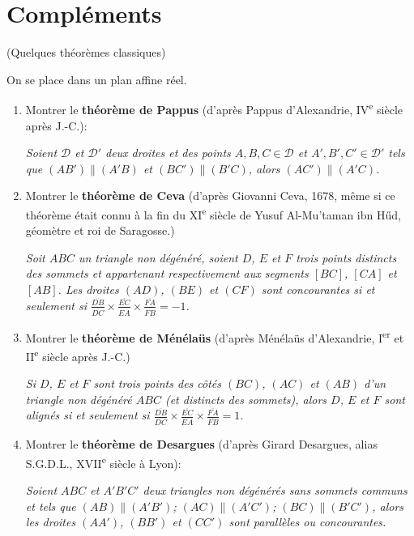 \documentclass[a4paper,12pt,reqno]{amsart}
\begin{document}
\section{Compléments}

\begin{exo} (Quelques théorèmes classiques)

  On se place dans un plan affine réel.

  \begin{enumerate}
  \item Montrer le \textbf{théorème de Pappus} (d'après Pappus d'Alexandrie, IV\textsuperscript{e} siècle après J.-C.):

  \textit{\og Soient $\mathcal{D}$ et $\mathcal{D}'$ deux droites et des points $A,B,C\in \mathcal{D}$ et $A',B',C'\in \mathcal{D}'$
  tels que $(AB')\parallel(A'B)$ et $(BC')\parallel(B'C)$, alors $(AC')\parallel(A'C)$.\fg}

  \item Montrer le \textbf{théorème de Ceva} (d'après Giovanni Ceva, 1678, même si ce théorème était connu à la fin du XI\textsuperscript{e} siècle de Yusuf Al-Mu'taman ibn Hűd, géomètre et roi de Saragosse.)

  \textit{\og Soit $ABC$ un triangle non dégénéré, soient $D$, $E$ et $F$ trois points distincts des sommets et appartenant respectivement aux segments $[BC]$, $[CA]$ et $[AB]$. Les droites $(AD)$, $(BE)$ et $(CF)$ sont concourantes si et seulement si $\frac{\overline{DB}}{\overline{DC}}\times\frac{\overline{EC}}{\overline{EA}}\times\frac{\overline{FA}}{\overline{FB}}=-1$.\fg}

  \item Montrer le \textbf{théorème de Ménélaüs} (d'après Ménélaüs d'Alexandrie, I\textsuperscript{er} et II\textsuperscript{e} siècle après J.-C.)

  \textit{\og Si $D$, $E$ et $F$ sont trois points des côtés $(BC)$, $(AC)$ et $(AB)$ d'un triangle non dégénéré $ABC$ (et distincts des sommets), alors $D$, $E$ et $F$ sont alignés si et seulement si $\frac{\overline{DB}}{\overline{DC}}\times\frac{\overline{EC}}{\overline{EA}}\times\frac{\overline{FA}}{\overline{FB}}=1$.\fg}

  \item Montrer le \textbf{théorème de Desargues} (d'après Girard Desargues, alias S.G.D.L., XVII\textsuperscript{e} siècle à Lyon):

  \textit{\og Soient $ABC$ et $A'B'C'$ deux triangles non dégénérés sans sommets communs et tels que $(AB)\parallel(A'B')$; $(AC)\parallel(A'C')$; $(BC)\parallel(B'C')$, alors les droites $(AA')$, $(BB')$ et $(CC')$ sont parallèles ou concourantes.\fg}

  \end{enumerate}
\end{exo}
\end{document}
